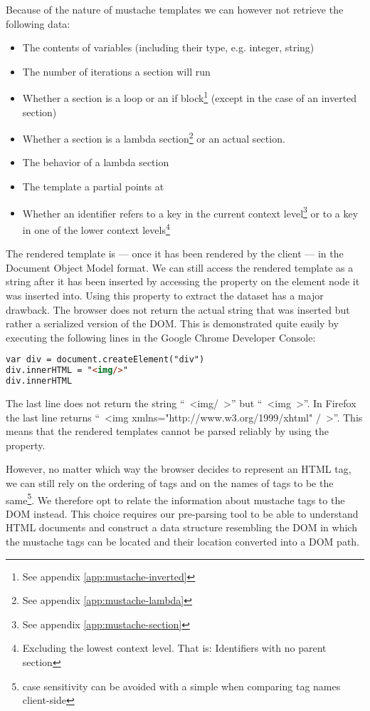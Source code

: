 \documentclass[thesis.tex]{subfiles}
\begin{document}
Because of the nature of mustache templates we can however not retrieve the
following data:

\begin{itemize}
\item The contents of variables (including their type, e.g. integer, string)
\item The number of iterations a section will run
\item Whether a section is a loop or an
	if block\footnote{See appendix \ref{app:mustache-inverted}}
	(except in the case of an inverted section)
\item Whether a section is a
	lambda section\footnote{See appendix \ref{app:mustache-lambda}}
	or an actual section.
\item The behavior of a lambda section
\item The template a partial points at
\item Whether an identifier refers to a key in the
	current context level\footnote{See appendix \ref{app:mustache-section}}
	or to a key in one of the lower context levels\footnote{Excluding the lowest
	context level. That is: Identifiers with no parent section}
\end{itemize}

The rendered template is --- once it has been rendered by the client ---
in the Document Object Model format.
We can still access the rendered template as a
string after it has been inserted by accessing the  property
on the element node it was inserted into.
Using this property to extract the dataset has a major drawback.
The browser does not return the actual string that was inserted but rather a
serialized version of the DOM. This is demonstrated quite easily by executing
the following lines in the Google Chrome Developer Console:
\begin{lstlisting}[language=HTML]
var div = document.createElement("div")
div.innerHTML = "<img/>"
div.innerHTML
\end{lstlisting}

The last line does not return the string ``\ <img/\ >'' but ``\ <img\ >''.
In Firefox the last line returns
``\ <img xmlns="http://www.w3.org/1999/xhtml" /\ >''.
This means that the rendered templates cannot be parsed reliably by using the
 property.

However, no matter which way the browser decides to represent an HTML tag,
we can still rely on the ordering of tags and on the names of tags to be
the same\footnote{case sensitivity can be avoided with a simple
 when comparing tag names client-side}.
We therefore opt to relate the information about mustache tags to the DOM
instead.
This choice requires our pre-parsing tool to be able to understand
HTML documents and construct a data structure resembling the DOM in which the
mustache tags can be located and their location converted into a DOM path.
\end{document}
